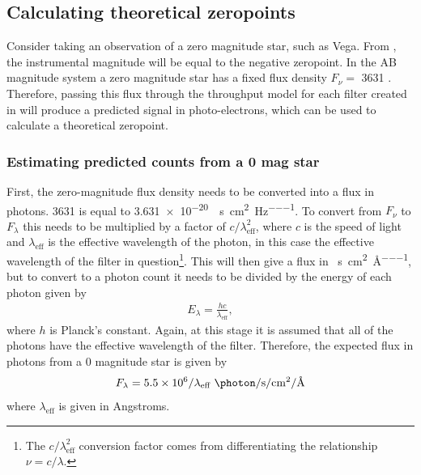 \subsection{Calculating theoretical zeropoints}
\label{sec:model_zeropoints}
\begin{colsection}

Consider taking an observation of a zero magnitude star, such as Vega. From , the instrumental magnitude will be equal to the negative zeropoint. In the AB magnitude system a zero magnitude star has a fixed flux density $F_\nu = $ \SI{3631}{\jansky} \citep{Sloan_filters}. Therefore, passing this flux through the throughput model for each filter created in  will produce a predicted signal in photo-electrons, which can be used to calculate a theoretical zeropoint.

\subsubsection{Estimating predicted counts from a 0 mag star}

First, the zero-magnitude flux density needs to be converted into a flux in photons. \SI{3631}{\jansky} is equal to \SI{3.631e-20}{\erg\per\second\per\centi\metre\squared\per\hertz}. To convert from $F_\nu$ to $F_\lambda$ this needs to be multiplied by a factor of $c/\lambda_\text{eff}^2$, where $c$ is the speed of light and $\lambda_\text{eff}$ is the effective wavelength of the photon, in this case the effective wavelength of the filter in question\footnote{The $c/\lambda_\text{eff}^2$ conversion factor comes from differentiating the relationship $\nu = c/\lambda$.}. This will then give a flux in \si{\erg\per\second\per\centi\metre\squared\per\angstrom}, but to convert to a photon count it needs to be divided by the energy of each photon given by
%
\begin{equation}
    \begin{split}
        E_\lambda = \frac{hc}{\lambda_\text{eff}},
    \end{split}
    \label{eq:photon_energy}
\end{equation}
%
where $h$ is Planck's constant. Again, at this stage it is assumed that all of the photons have the effective wavelength of the filter. Therefore, the expected flux in photons from a 0 magnitude star is given by
%
\begin{equation}
    \begin{split}
        F_\lambda = 5.5 \times 10^{6}/\lambda_\text{eff}~\si{\photon\per\second\per\centi\metre\squared\per\angstrom}
    \end{split}
    \label{eq:zero-mag_photons}
\end{equation}
%
where $\lambda_\text{eff}$ is given in Angstroms.


\end{colsection}
